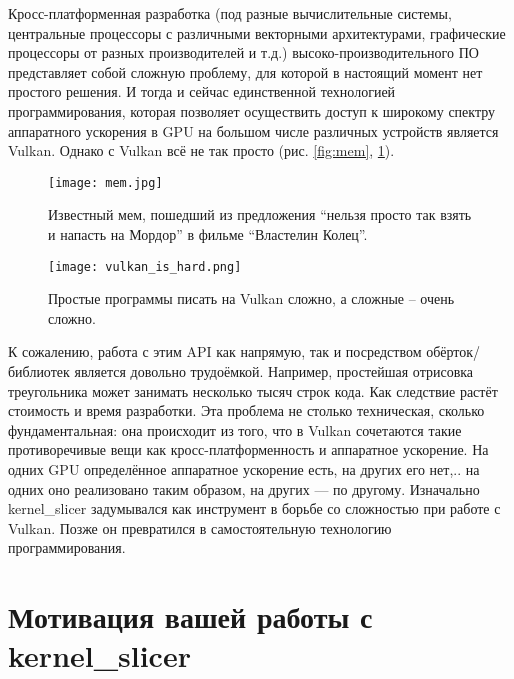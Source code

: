 \documentclass[11pt,fleqn,english,russian]{report} %
\begin{document}
Кросс-платформенная разработка (под разные вычислительные системы, центральные процессоры с различными векторными архитектурами, графические процессоры от разных производителей и т.д.)  высоко-производительного ПО представляет собой сложную проблему, для которой в настоящий момент нет простого решения. И тогда и сейчас единственной технологией программирования, которая позволяет осуществить доступ к широкому спектру аппаратного ускорения в GPU на большом числе различных устройств является Vulkan. Однако с Vulkan всё не так просто (рис. \ref{fig:mem}, \ref{fig:vulkan_complexity}). 

\begin{figure}[h]
\begin{minipage}{0.45\textwidth}
	\centering
	\texttt{[image: mem.jpg]}
	\caption{Известный мем, пошедший из предложения ``нельзя просто так взять и напасть на Мордор'' в фильме ``Властелин Колец''.}
	\label{fig:mem}
\end{minipage}
\hfill
\begin{minipage}{0.45\textwidth}
	\centering
	\texttt{[image: vulkan\_is\_hard.png]}
	\caption{Простые программы писать на Vulkan сложно, а сложные -- очень сложно.}
	\label{fig:vulkan_complexity}
\end{minipage}
\end{figure}


К сожалению, работа с этим API как напрямую, так и посредством обёрток/библиотек является довольно трудоёмкой. Например, простейшая отрисовка треугольника может занимать несколько тысяч строк кода. Как следствие растёт стоимость и время разработки. Эта проблема не столько техническая, сколько фундаментальная: она происходит из того, что в Vulkan сочетаются такие противоречивые вещи как кросс-платформенность и аппаратное ускорение. На одних GPU определённое аппаратное ускорение есть, на других его нет,.. на одних оно реализовано таким образом, на других --- по другому. Изначально kernel\_slicer задумывался как инструмент в борьбе со сложностью при работе с Vulkan. Позже он превратился в самостоятельную технологию программирования.

\section{Мотивация вашей работы с kernel\_slicer }
\end{document}
